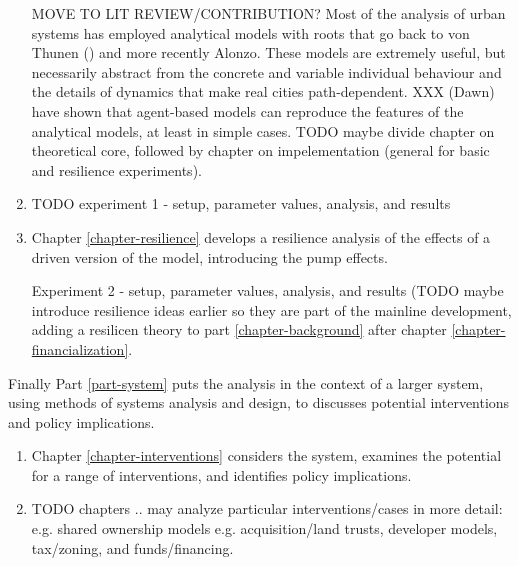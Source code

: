 \begin{enumerate}
MOVE TO LIT REVIEW/CONTRIBUTION?
Most of the analysis of urban systems has employed analytical models with roots that go back to von Thunen () and more recently Alonzo. These models are extremely useful, but necessarily abstract from the concrete  and variable individual behaviour and  the details  of dynamics that make real cities path-dependent. XXX (Dawn) have shown that agent-based models can reproduce the features of the analytical models, at least in simple cases. TODO maybe divide chapter on theoretical core, followed by chapter on impelementation (general for basic and resilience experiments).
    \item TODO experiment 1 - setup, parameter values,  analysis, and results
    \item Chapter \ref{chapter-resilience} develops a resilience analysis of the effects of a driven version of the model, introducing the pump effects.  

Experiment 2 - setup, parameter values,  analysis, and results (TODO maybe introduce resilience ideas earlier so they are part of the mainline development, adding a resilicen theory to part  \ref{chapter-background} after chapter \ref{chapter-financialization}.
\end{enumerate}

 Finally Part \ref{part-system} puts the analysis %
in the context of a larger system, using methods of systems analysis and design, to discusses potential interventions and policy implications.
\begin{enumerate}
    \item Chapter \ref{chapter-interventions} considers the system, examines the potential for a range of interventions, and identifies policy implications. %
    \item TODO chapters .. may analyze particular interventions/cases in more detail: e.g. shared ownership models e.g. acquisition/land trusts, developer models, tax/zoning, and funds/financing.
\end{enumerate}


